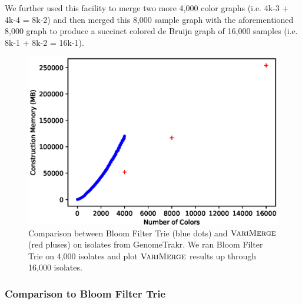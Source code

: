 We further used this facility to merge two more 4,000 color graphs (i.e. 4k-3 + 4k-4 = 8k-2) and then merged this 8,000 sample graph with the aforementioned 8,000 graph to produce a succinct colored de Bruijn graph of 16,000 samples (i.e. 8k-1 + 8k-2 = 16k-1).

















\begin{figure}[h!t]
  \includegraphics[width=1.0\textwidth]{varimerge/content/BFTvsVARI.eps}
    \caption{Comparison between Bloom Filter Trie (blue dots) and $\mbox{\rm {\sc VariMerge}}$ (red pluses) on isolates from GenomeTrakr.  We ran Bloom Filter Trie on 4,000 isolates and plot $\mbox{\rm {\sc VariMerge}}$ results up through 16,000 isolates.}

\label{fig:bftvsvari}
\end{figure}


\subsubsection{Comparison to Bloom Filter Trie}

